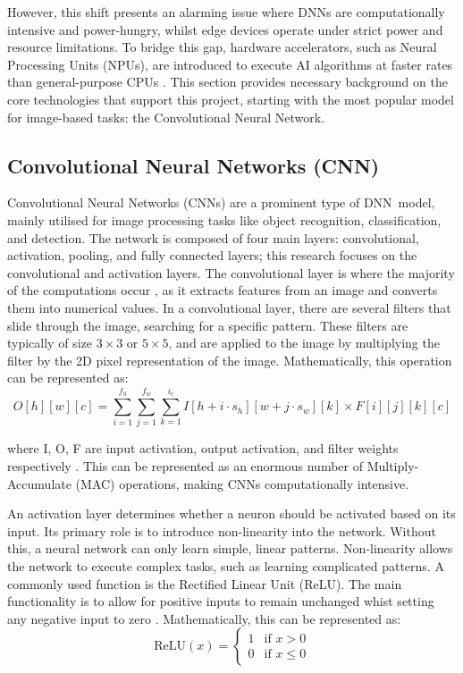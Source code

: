 \documentclass[12pt, a4paper, ukenglish]{article}
\begin{document}
    However, this shift presents an alarming issue where DNNs are computationally intensive and power-hungry, whilst edge devices operate under strict power and resource limitations. To bridge this gap, hardware accelerators, such as Neural Processing Units (NPUs), are introduced to execute AI algorithms at faster rates than general-purpose CPUs \cite{manor_custom_2022}. This section provides necessary background on the core technologies that support this project, starting with the most popular model for image-based tasks: the Convolutional Neural Network.

    \subsection{Convolutional Neural Networks (CNN)} \label{sec:CNN}
    Convolutional Neural Networks (CNNs) are a prominent type of DNN~model, mainly utilised for image processing tasks like object recognition, classification, and detection. The network is composed of four main layers: convolutional, activation, pooling, and fully connected layers; this research focuses on the convolutional and activation layers. The convolutional layer is where the majority of the computations occur \cite{choi_enabling_2023}, as it extracts features from an image and converts them into numerical values. In a convolutional layer, there are several filters that slide through the image, searching for a specific pattern. These filters are typically of size $3\times3$ or $5\times5$, and are applied to the image by multiplying the filter by the 2D pixel representation of the image. Mathematically, this operation can be represented as:
    \[
    O[h][w][c] = \sum_{i=1}^{f_h} \sum_{j=1}^{f_w} \sum_{k=1}^{i_c} I[h + i \cdot s_h][w + j \cdot s_w][k] \times F[i][j][k][c]
    \]

    where I, O, F are input activation, output activation, and filter weights respectively \cite{choi_enabling_2023}. This can be represented as an enormous number of Multiply-Accumulate (MAC) operations, making CNNs computationally intensive. 

    An activation layer determines whether a neuron should be activated based on its input. Its primary role is to introduce non-linearity into the network. Without this, a neural network can only learn simple, linear patterns. Non-linearity allows the network to execute complex tasks, such as learning complicated patterns. A commonly used function is the Rectified Linear Unit (ReLU). The main functionality is to allow for positive inputs to remain unchanged whist setting any negative input to zero \cite{parashar_scnn_2017}. Mathematically, this can be represented as:
    \[
    \text{ReLU}(x) = 
    \begin{cases} 
        1 & \text{if } x > 0 \\ 
        0 & \text{if } x \le 0 
    \end{cases}
    \]
\end{document}
